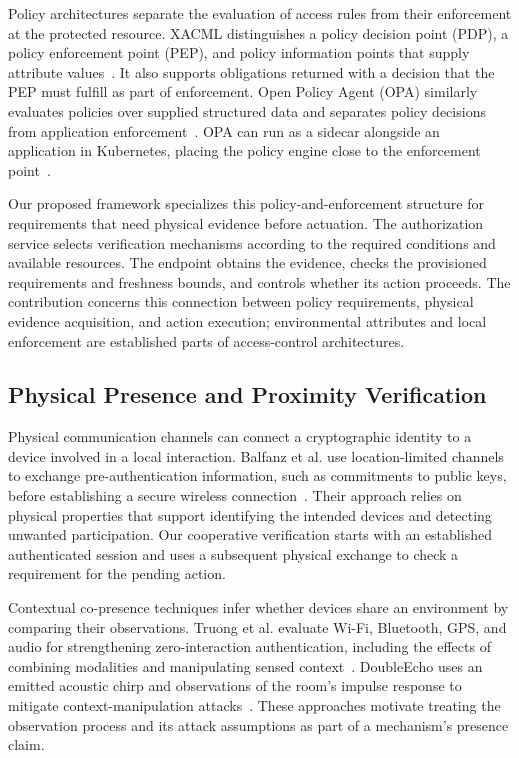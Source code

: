\documentclass[sigconf,authordraft]{acmart}
\begin{document}
Policy architectures separate the evaluation of access rules from their enforcement at the protected resource.
XACML distinguishes a policy decision point (PDP), a policy enforcement point (PEP), and policy information points that supply attribute values~\cite{oasis2013xacml}.
It also supports obligations returned with a decision that the PEP must fulfill as part of enforcement.
Open Policy Agent (OPA) similarly evaluates policies over supplied structured data and separates policy decisions from application enforcement~\cite{opaDocumentation}.
OPA can run as a sidecar alongside an application in Kubernetes, placing the policy engine close to the enforcement point~\cite{opaKubernetes}.

Our proposed framework specializes this policy-and-enforcement structure for requirements that need physical evidence before actuation.
The authorization service selects verification mechanisms according to the required conditions and available resources.
The endpoint obtains the evidence, checks the provisioned requirements and freshness bounds, and controls whether its action proceeds.
The contribution concerns this connection between policy requirements, physical evidence acquisition, and action execution; environmental attributes and local enforcement are established parts of access-control architectures.

\subsection{Physical Presence and Proximity Verification}

Physical communication channels can connect a cryptographic identity to a device involved in a local interaction.
Balfanz et al. use location-limited channels to exchange pre-authentication information, such as commitments to public keys, before establishing a secure wireless connection~\cite{balfanz2002talking}.
Their approach relies on physical properties that support identifying the intended devices and detecting unwanted participation.
Our cooperative verification starts with an established authenticated session and uses a subsequent physical exchange to check a requirement for the pending action.

Contextual co-presence techniques infer whether devices share an environment by comparing their observations.
Truong et al. evaluate Wi-Fi, Bluetooth, GPS, and audio for strengthening zero-interaction authentication, including the effects of combining modalities and manipulating sensed context~\cite{truong2014copresence}.
DoubleEcho uses an emitted acoustic chirp and observations of the room's impulse response to mitigate context-manipulation attacks~\cite{truong2019doubleecho}.
These approaches motivate treating the observation process and its attack assumptions as part of a mechanism's presence claim.
\end{document}
